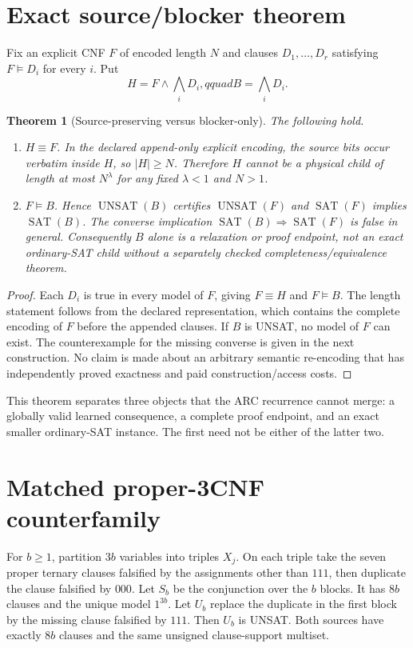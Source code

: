 \documentclass[11pt]{article}
\newtheorem{theorem}{Theorem}
\begin{document}
\section{Exact source/blocker theorem}
Fix an explicit CNF $F$ of encoded length $N$ and clauses
$D_1,\ldots,D_r$ satisfying $F\models D_i$ for every $i$.  Put
\[
 H=F\wedge\bigwedge_iD_i,qquad B=\bigwedge_iD_i.
\]

\begin{theorem}[Source-preserving versus blocker-only]
The following hold.
\begin{enumerate}
\item $H\equiv F$.  In the declared append-only explicit encoding, the source
bits occur verbatim inside $H$, so $|H|\ge N$.  Therefore $H$ cannot be a
physical child of length at most $N^\lambda$ for any fixed $\lambda<1$ and
$N>1$.
\item $F\models B$.  Hence $\operatorname{UNSAT}(B)$ certifies
$\operatorname{UNSAT}(F)$ and $\operatorname{SAT}(F)$ implies
$\operatorname{SAT}(B)$.  The converse implication
$\operatorname{SAT}(B)\Rightarrow\operatorname{SAT}(F)$ is false in general.
Consequently $B$ alone is a relaxation or proof endpoint, not an exact
ordinary-SAT child without a separately checked completeness/equivalence
theorem.
\end{enumerate}
\end{theorem}
\begin{proof}
Each $D_i$ is true in every model of $F$, giving $F\equiv H$ and
$F\models B$.  The length statement follows from the declared representation,
which contains the complete encoding of $F$ before the appended clauses.
If $B$ is UNSAT, no model of $F$ can exist.  The counterexample for the missing
converse is given in the next construction.  No claim is made about an
arbitrary semantic re-encoding that has independently proved exactness and paid
construction/access costs.
\end{proof}

This theorem separates three objects that the ARC recurrence cannot merge:
a globally valid learned consequence, a complete proof endpoint, and an exact
smaller ordinary-SAT instance.  The first need not be either of the latter two.

\section{Matched proper-3CNF counterfamily}
For $b\ge1$, partition $3b$ variables into triples $X_j$.  On each triple take
the seven proper ternary clauses falsified by the assignments other than
$111$, then duplicate the clause falsified by $000$.  Let $S_b$ be the
conjunction over the $b$ blocks.  It has $8b$ clauses and the unique model
$1^{3b}$.  Let $U_b$ replace the duplicate in the first block by the missing
clause falsified by $111$.  Then $U_b$ is UNSAT.  Both sources have exactly
$8b$ clauses and the same unsigned clause-support multiset.
\end{document}
